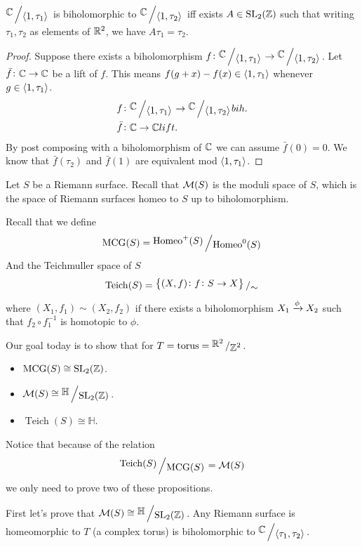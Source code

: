 \documentclass[11pt,a4paper]{article}
\renewcommand{\H}{\mathbb H}
\DeclareMathOperator{\Homeo}{Homeo}
\DeclareMathOperator{\MCG}{MCG}
\DeclareMathOperator{\Teich}{Teich}
\begin{document}
\begin{theorem}
  $\bigslant{\C}{\ip{1}{\tau_1}}$ is biholomorphic to 
  $\bigslant{\C}{\ip{1}{\tau_2}}$ iff exists $A \in \mathrm{SL}_2(\mathbb{Z})$
  such that writing $\tau_1, \tau_2$ as elements of $\mathbb{R}^2$, we have
  $A\tau_1 = \tau_2$.
\end{theorem}
\begin{proof}
  Suppose there exists a biholomorphism 
  $f \colon \bigslant{\C}{\ip{1}{\tau_1}} \to \bigslant{\C}{\ip{1}{\tau_2}}$.
  Let $\bar f \colon \mathbb{C} \to \mathbb{C}$ be a lift of $f$.
  This means $f(g + x) - f(x) \in \left\langle 1, \tau_1 \right\rangle$ whenever
  $g \in \left\langle 1, \tau_1 \right\rangle$.
  \begin{align*}
    &f \colon \bigslant{\C}{\ip{1}{\tau_1}} \to \bigslant{\C}{\ip{1}{\tau_2}}
    bih. \\
    &\bar f \colon \C \to \C lift.
  \end{align*}
  By post composing with a biholomorphism of $\mathbb{C}$ we can assume $\bar f(0) = 0$.
  We know that $\bar f(\tau_2)$ and $\bar f(1)$ are equivalent mod
  $\left\langle 1, \tau_1 \right\rangle$.
\end{proof}


\begin{remark}
  Let $S$ be a Riemann surface.
  Recall that $\mathcal{M}(S)$ is the moduli space of $S$, which is the space of Riemann
  surfaces homeo to $S$ up to biholomorphism.
\end{remark}
Recall that we define
\[
  \MCG(S) = \bigslant{\Homeo^+(S)}{\Homeo^0(S)}
\]
And the Teichmuller space of $S$
\[
  \mathrm{Teich}(S) = 
  \bigslant{\set{(X,f) \colon f \colon S \to X}}{\sim}
\]
where $(X_1,f_1) \sim (X_2,f_2)$ if there exists a biholomorphism 
$X_1 \xrightarrow{\phi} X_2$ such that $f_2 \circ f_1^{-1}$ is homotopic to $\phi$.

Our goal today is to show that for $T = \text{torus} = \bigslant{\R^2}{\Z^2}$.
\begin{itemize}
  \item $\MCG(S) \cong \SL_2(\Z)$.
  \item $\M(S) \cong \bigslant{\H}{\SL_2(\Z)}$.
  \item $\Teich(S) \cong \H$.
\end{itemize}

Notice that because of the relation
\[
  \bigslant{\Teich(S)}{\MCG(S)} = \M(S)
\]
we only need to prove two of these propositions.

First let's prove that $\M(S) \cong \bigslant{\H}{\SL_2(\Z)}$.
Any Riemann surface is homeomorphic to $T$ (a complex torus) is biholomorphic
to $\bigslant{\C}{\ip{\tau_1}{\tau_2}}$.
\end{document}
